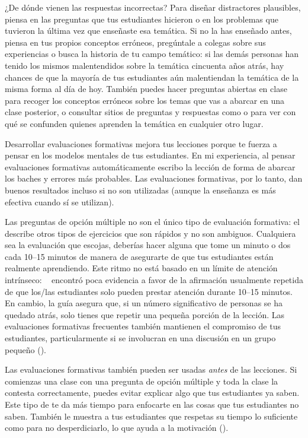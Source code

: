 \begin{aside}{¿De dónde vienen las respuestas incorrectas?}
 Para diseñar distractores plausibles,
piensa en las preguntas que tus estudiantes hicieron o en los problemas que tuvieron la última vez que enseñaste esa temática.
Si no la has enseñado antes,
piensa en tus propios conceptos erróneos,
pregúntale a colegas sobre sus experiencias
o busca la historia de tu campo temático:
si las demás personas han tenido los mismos malentendidos sobre la temática cincuenta años atrás,
hay chances de que la mayoría de tus estudiantes aún malentiendan la temática de la misma forma al día de hoy.
También puedes hacer preguntas abiertas en clase
para recoger los conceptos erróneos sobre los temas que vas a abarcar en una clase posterior,
o consultar sitios de preguntas y respuestas como 
  o 
  para ver con qué se confunden quienes aprenden la temática en cualquier otro lugar.
\end{aside}

Desarrollar evaluaciones formativas mejora tus lecciones
porque te fuerza a pensar en los modelos mentales de tus estudiantes.
En mi experiencia,
al pensar evaluaciones formativas automáticamente escribo la lección de forma de abarcar los baches y errores más probables.
Las evaluaciones formativas, por lo tanto, dan buenos resultados incluso si no son utilizadas
(aunque la enseñanza es más efectiva cuando sí se utilizan).

Las preguntas de opción múltiple no son el único tipo de evaluación formativa:
el  describe otros tipos de ejercicios que son rápidos y no son ambiguos.
Cualquiera sea la evaluación que escojas,
deberías hacer alguna que tome un minuto o dos cada 10--15 minutos
de manera de asegurarte de que tus estudiantes están realmente aprendiendo.
Este ritmo no está basado en un límite de atención intrínseco: ~\cite{Wils2007}
encontró poca evidencia a favor de la afirmación usualmente repetida de que
los/las estudiantes solo pueden prestar atención durante 10--15 minutos.
En cambio,
la guía asegura que, si un número significativo de personas se ha quedado atrás,
solo tienes que repetir una pequeña porción de la lección.
Las evaluaciones formativas frecuentes también mantienen el compromiso de tus estudiantes, 
particularmente si se involucran en una discusión en un grupo pequeño
().

Las evaluaciones formativas también pueden ser usadas \emph{antes} de las lecciones.
Si comienzas una clase con una pregunta de opción múltiple y toda la clase la contesta correctamente,
puedes evitar explicar algo que tus estudiantes ya saben.
Este tipo de 
te da más tiempo para enfocarte en las cosas que tus estudiantes no saben.
También le muestra a tus estudiantes que respetas su tiempo lo suficiente como para no desperdiciarlo,
lo que ayuda a la motivación ().

